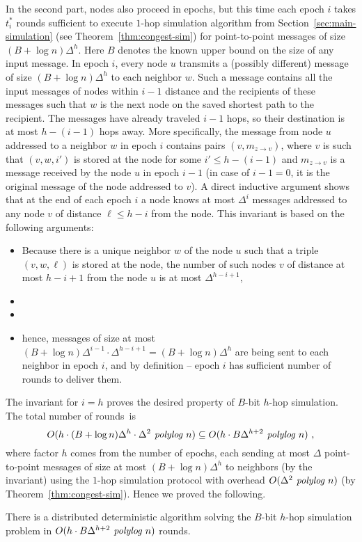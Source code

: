 In the second part, nodes also proceed in epochs, but this time each epoch $i$ takes $t^*_i$ rounds sufficient to execute $1$-hop simulation algorithm from Section~\ref{sec:main-simulation} (see Theorem~\ref{thm:congest-sim}) for point-to-point messages of size $(B+\log n)\Delta^h$. 
Here $B$ denotes the known upper bound on the size of any input message.
In epoch $i$, every node $u$ transmits a (possibly different) message of size $(B+\log n)\Delta^h$ to each neighbor $w$. Such a message contains all the input messages of nodes within $i-1$ distance and the recipients of these messages such that $w$ is the next node on the saved shortest path to the recipient. The messages have already traveled $i-1$ hops, so their destination is at most $h-(i-1)$ hops away. More specifically, the message from node $u$
addressed to a neighbor $w$ in epoch $i$ 
contains pairs $(v,m_{z \rightarrow v})$, where $v$ is such that $(v,w,i')$ is stored at the node for some $i'\le h-(i-1)$ and $m_{z \rightarrow v}$ is a message received by the node $u$ in epoch $i-1$ (in case of $i-1=0$, it is the original message of the node addressed to $v$).
A direct inductive argument shows that at the end of each epoch $i$ a node knows at most $\Delta^i$ messages addressed to any node $v$ of distance $\ell \le h-i$ from the node. This invariant is based on the following arguments: 
\begin{itemize}
\item 
Because there is a unique neighbor $w$ of the node $u$ such that a triple $(v,w,\ell)$ is stored at the node, 
the number of such nodes $v$ of distance at most $h-i+1$ from the node $u$ is at most $\Delta^{h-i+1}$, 
\item {}
\item {}
\item 
hence, messages of size at most $(B+\log n)\Delta^{i-1} \cdot \Delta^{h-i+1} = (B+\log n) \Delta^h$ are being sent to each neighbor in epoch $i$, and by definition -- epoch $i$ has sufficient number of rounds to deliver them. 
\end{itemize}
The invariant for $i=h$ proves the desired property of $B$-bit $h$-hop simulation. The total number of rounds~is 
\[
O(h\cdot (B+\log n)\Delta^h \cdot \Delta^2\text{\em\ polylog } n) 
\subseteq
O(h\cdot B\Delta^{h+2} \text{\em\ polylog } n) 
\ ,
\]
where factor $h$ comes from the number of epochs, each sending at most $\Delta$ point-to-point messages of size at most $(B+\log n)\Delta^h$ to neighbors (by the invariant) using the $1$-hop simulation protocol with overhead $O(\Delta^2 \text{\em\ polylog } n)$ (by Theorem~\ref{thm:congest-sim}).
Hence we proved the following.


\begin{theorem}\label{thm:multihopub}
There is a distributed deterministic algorithm solving the $B$-bit $h$-hop simulation problem  in $O(h\cdot B\Delta^{h+2}\text{\em\ polylog } n)$ rounds.
\end{theorem}


